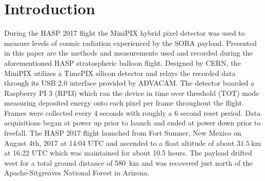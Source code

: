 \section{Introduction}
\label{Introduction}

During the HASP 2017\cite{hasp} flight the MiniPIX hybrid pixel detector\cite{minipix} was used to measure levels of cosmic radiation experienced by 
the SORA payload\cite{sora}. Presented in this paper are the methods and measurements used and recorded during the aforementioned HASP stratospheric balloon flight. 
Designed by CERN\cite{cern}, the MiniPIX utilizes a TimePIX\cite{timepix} silicon detector and relays the recorded data through its USB 2.0 interface provided by 
ADVACAM\cite{advacam}. The detector boarded a Raspberry PI 3 (RPI3) which ran the device in time over threshold (TOT) mode measuring deposited energy onto each 
pixel per frame throughout the flight. Frames were collected every 4 seconds with roughly a 6 second reset period. Data acquisitions began at power up prior to 
launch and ended at power down prior to freefall. The HASP 2017 flight launched from Fort Sumner, New Mexico on August 4th, 2017 at 14:04 UTC 
and ascended to a float altitude of about $\SI{31.5}{\kilo\meter}$ at 16:22 UTC which was maintained for about 10.5 hours. The payload drifted west for a total 
ground distance of \SI{580}{\kilo\meter} and was recovered just north of the Apache-Sitgreaves National Forest in Arizona.
